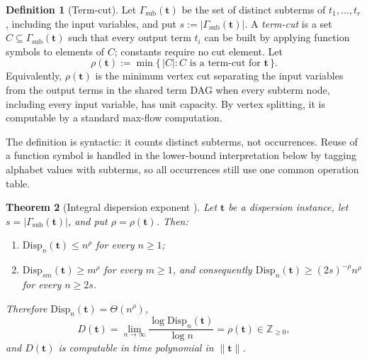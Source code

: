 \documentclass[11pt]{article}
\newcommand{\instsize}[1]{\lVert #1\rVert}
\theoremstyle{definition}
\newtheorem{definition}{Definition}[section]
\theoremstyle{plain}
\newtheorem{theorem}[definition]{Theorem}
\newcommand{\Disp}{\mathrm{Disp}}
\begin{document}
\begin{definition}[Term-cut]
\label{def:term-cut}
Let $\Gamma_{\mathrm{sub}}(\mathbf t)$ be the set of distinct subterms of
$t_1,\dots,t_r$, including the input variables, and put
$s:=|\Gamma_{\mathrm{sub}}(\mathbf t)|$.  A \emph{term-cut} is a set
$C\subseteq\Gamma_{\mathrm{sub}}(\mathbf t)$ such that every output term $t_i$ can be built by applying
function symbols to elements of $C$; constants require no cut element.  Let
\[
\rho(\mathbf t):=\min\{\,|C|:C\text{ is a term-cut for }\mathbf t\,\}.
\]
Equivalently, $\rho(\mathbf t)$ is the minimum vertex cut separating the input variables from the output
terms in the shared term DAG when every subterm node, including every input variable, has unit capacity.
By vertex splitting, it is computable by a standard max-flow computation.
\end{definition}

The definition is syntactic: it counts distinct subterms, not occurrences.  Reuse of a function symbol is
handled in the lower-bound interpretation below by tagging alphabet values with subterms, so all occurrences
still use one common operation table.

\begin{theorem}[Integral dispersion exponent {\protect\citep{riis2019max}}]
\label{thm:disp-exponent}
Let $\mathbf t$ be a dispersion instance, let $s=|\Gamma_{\mathrm{sub}}(\mathbf t)|$, and put
$\rho=\rho(\mathbf t)$.  Then:
\begin{enumerate}[label=\textit{(\alph*)}, leftmargin=*]
\item $\Disp_n(\mathbf t)\le n^\rho$ for every $n\ge 1$;
\item $\Disp_{sm}(\mathbf t)\ge m^\rho$ for every $m\ge 1$, and consequently
      $\Disp_n(\mathbf t)\ge (2s)^{-\rho}n^\rho$ for every $n\ge 2s$.
\end{enumerate}
Therefore $\Disp_n(\mathbf t)=\Theta(n^\rho)$,
\[
D(\mathbf t)=\lim_{n\to\infty}\frac{\log\Disp_n(\mathbf t)}{\log n}=\rho(\mathbf t)\in\mathbb Z_{\ge0},
\]
and $D(\mathbf t)$ is computable in time polynomial in $\instsize{\mathbf t}$.
\end{theorem}
\end{document}
